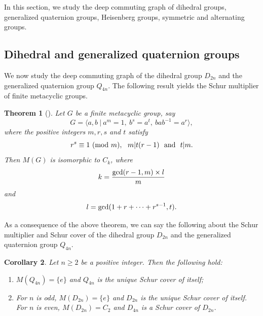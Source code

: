 \documentclass[12pt,a4paper]{article}
\newtheorem{theorem}{Theorem}[section]
\newtheorem{corollary}[theorem]{Corollary}
\begin{document}
In this section, we study the deep commuting graph of dihedral groups, generalized quaternion groups, Heisenberg groups, symmetric and alternating groups.

\subsection{Dihedral and generalized quaternion groups}
We now study the deep commuting graph of the dihedral group $D_{2n}$ and the generalized quaternion group $Q_{4n}$. The following result yields the Schur multiplier of finite metacyclic groups.
\begin{theorem}[{\rm\cite[Theorem 2.11.3]{karpi}}]\label{meta_schur}
Let $G$ be a finite metacyclic group, say \[G=\langle a,b~|~a^m=1,~b^s=a^t,~bab^{-1}=a^r\rangle,\]
where the positive integers $m,r,s$ and $t$ satisfy \[r^s\equiv1~({\rm mod}~m),~~m|t(r-1)~~\text{and}~~t|m.\] 
Then $M(G)$ is isomorphic to $C_k$, where \[k=\frac{{\rm gcd}(r-1,m)\times l}{m}\] and \[l={\rm gcd}(1+r+\dots+r^{s-1},t).\]
\end{theorem}
As a consequence of the above theorem, we can say the following about the Schur multiplier and Schur cover of the dihedral group $D_{2n}$ and the generalized quaternion group $Q_{4n}$.
\begin{corollary}\label{Schur cover of D_2n and Q_4n}
Let $n\geq 2$ be a positive integer. Then the following hold:
\begin{enumerate}[\rm (i)]
    \item $M(Q_{4n})=\{e\}$ and $Q_{4n}$ is the unique Schur cover of itself;
    \item For $n$ is odd, $M(D_{2n})=\{e\}$ and $D_{2n}$ is the unique Schur cover of itself. For $n$ is even, $M(D_{2n})=C_2$ and $D_{4n}$ is a Schur cover of $D_{2n}$.
\end{enumerate}
\end{corollary}
\end{document}
